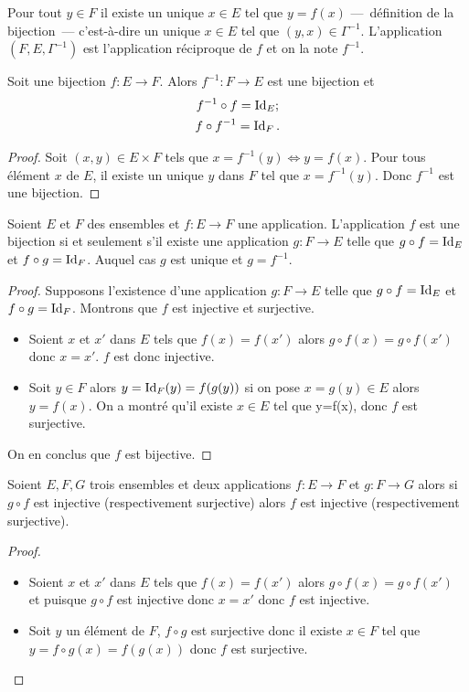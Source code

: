 Pour tout $y \in F$ il existe un unique $x \in E$ tel que $y=f(x)$ ---~définition de la bijection~--- c'est-à-dire un unique $x \in E$ tel que $(y,x) \in \Gamma^{-1}$. L'application $(F,E,\Gamma^{-1})$ est l'application réciproque de $f$ et on la note $f^{-1}$.
%
\begin{prop} Soit une bijection $f : E \longrightarrow F$. Alors $f^{-1} : F \longrightarrow E$ est une bijection et
  \begin{gather}
    f^{-1} \circ f =\operatorname{Id}_E; \\
    f \circ f^{-1}=\operatorname{Id}_F.
  \end{gather}
\end{prop}
\begin{proof}
Soit $(x,y) \in E \times F$ tels que $x=f^{-1}(y) \iff y=f(x)$. Pour tous élément $x$ de $E$, il existe un unique $y$ dans $F$ tel que $x=f^{-1}(y)$. Donc $f^{-1}$ est une bijection.
\end{proof}
%
\begin{theo}
Soient $E$ et $F$ des ensembles et $f:E \longrightarrow F$ une application. L'application $f$ est une bijection si et seulement s'il existe une application $g:F \longrightarrow E$ telle que $g \circ f = \operatorname{Id}_E$ et $f \circ g = \operatorname{Id}_F$. Auquel cas $g$ est unique et $g=f^{-1}$.
\end{theo}
\begin{proof}
  Supposons l'existence d'une application $g:F \longrightarrow E$ telle que $g \circ f = \operatorname{Id}_E$ et $f \circ g = \operatorname{Id}_F$. Montrons que $f$ est injective et surjective.
  \begin{itemize}
  \item Soient $x$ et $x'$ dans $E$ tels que $f(x)=f(x')$ alors $g \circ f(x) = g \circ f(x')$ donc $x=x'$. $f$ est donc injective.
  \item Soit $y \in F$ alors $y=\operatorname{Id}_F(y)=f(g(y))$ si on pose $x=g(y) \in E$ alors $y=f(x)$. On a montré qu'il existe $x \in E$ tel que y=f(x), donc $f$ est surjective.
  \end{itemize}
  On en conclus que $f$ est bijective.
\end{proof}
%
\begin{prop}
  Soient $E,F,G$ trois ensembles et deux applications $f:E \longrightarrow F$ et $g:F \longrightarrow G$ alors si $g \circ f$ est injective (respectivement surjective) alors $f$ est injective (respectivement surjective).
\end{prop}
\begin{proof}
  \begin{itemize}
  \item Soient $x$ et $x'$ dans $E$ tels que $f(x)=f(x')$ alors $g \circ f(x) = g \circ f(x')$ et puisque $g \circ f$ est injective donc $x=x'$ donc $f$ est injective.
  \item Soit $y$ un élément de $F$, $f \circ g$ est surjective donc il existe $x \in F$ tel que $y=f \circ g(x)=f(g(x))$ donc $f$ est surjective.
  \end{itemize}
\end{proof}
